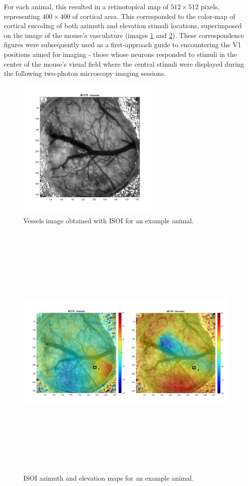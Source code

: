 For each animal, this resulted in a retinotopical map of $512 \times 512$ pixels, representing $400 \times 400$ of cortical area. This corresponded to the color-map of cortical encoding of both azimuth and elevation stimuli locations, superimposed on the image of the mouse's vasculature (images \ref{vessels} and \ref{mapping}). These correspondence figures were subsequently used as a first-approach guide to encountering the V1 positions aimed for imaging - those whose neurons responded to stimuli in the center of the mouse's visual field where the central stimuli were displayed during the following two-photon microscopy imaging sessions.
\begin{figure}[H] \centering \includegraphics[width=7cm,height=7cm,keepaspectratio]{Figures/7.Results/intrinsic/MF379_Vessels.png} 
\caption{Vessels image obtained with ISOI for an example animal.}
\label{vessels}
\end{figure}
\begin{figure}[H] \centering \includegraphics[width=13cm,height=13cm,keepaspectratio]{Figures/7.Results/intrinsic/mapping.png} 
\caption{ISOI azimuth and elevation maps for an example animal.}
\label{mapping}
\end{figure}

